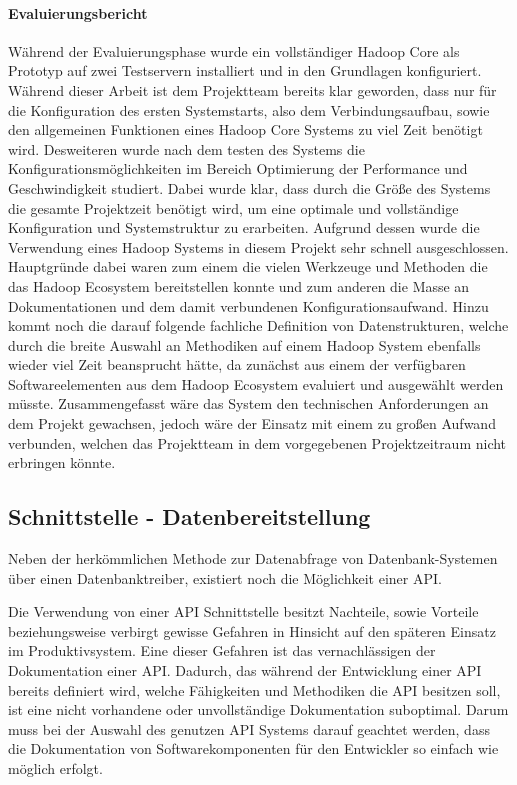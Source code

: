 \paragraph{Evaluierungsbericht}
\label{paragraph:hadoop_hive_impala_evaluierung}
Während der Evaluierungsphase wurde ein vollständiger Hadoop Core als Prototyp
auf zwei Testservern installiert und in den Grundlagen konfiguriert. Während
dieser Arbeit ist dem Projektteam bereits klar geworden, dass nur für die
Konfiguration des ersten Systemstarts, also dem Verbindungsaufbau, sowie den
allgemeinen Funktionen eines Hadoop Core Systems zu viel Zeit
benötigt wird. Desweiteren wurde nach dem testen des Systems die
Konfigurationsmöglichkeiten im Bereich Optimierung der Performance und
Geschwindigkeit studiert. Dabei wurde klar, dass durch die Größe des
Systems die gesamte Projektzeit benötigt wird, um eine optimale und
vollständige Konfiguration und Systemstruktur zu erarbeiten. Aufgrund
dessen wurde die Verwendung eines Hadoop Systems in diesem Projekt sehr
schnell ausgeschlossen. Hauptgründe dabei waren zum einem die vielen Werkzeuge
und Methoden die das Hadoop Ecosystem bereitstellen konnte und zum anderen
die Masse an Dokumentationen und dem damit verbundenen Konfigurationsaufwand.
Hinzu kommt noch die darauf folgende fachliche Definition von Datenstrukturen,
welche durch die breite Auswahl an Methodiken auf einem Hadoop System ebenfalls
wieder viel Zeit beansprucht hätte, da zunächst aus einem der verfügbaren
Softwareelementen aus dem Hadoop Ecosystem evaluiert und ausgewählt werden
müsste. Zusammengefasst wäre das System den technischen Anforderungen an dem
Projekt gewachsen, jedoch wäre der Einsatz mit einem zu großen Aufwand
verbunden, welchen das Projektteam in dem vorgegebenen Projektzeitraum nicht
erbringen könnte.
\nl%

\subsection{Schnittstelle - Datenbereitstellung}
\label{subsec:schnittstelle_datenbereitstellung}
Neben der herkömmlichen Methode zur Datenabfrage von Datenbank-Systemen über
einen Datenbanktreiber, existiert noch die Möglichkeit einer API\@.

Die Verwendung von einer API Schnittstelle besitzt Nachteile, sowie Vorteile
beziehungsweise verbirgt gewisse Gefahren in Hinsicht auf den späteren Einsatz
im Produktivsystem. Eine dieser Gefahren ist das vernachlässigen der
Dokumentation einer API\@. Dadurch, das während der Entwicklung einer API
bereits definiert wird, welche Fähigkeiten und Methodiken die API besitzen
soll, ist eine nicht vorhandene oder unvollständige Dokumentation suboptimal.
Darum muss bei der Auswahl des genutzen API Systems darauf geachtet werden,
dass die Dokumentation von Softwarekomponenten für den Entwickler so einfach
wie möglich erfolgt.

